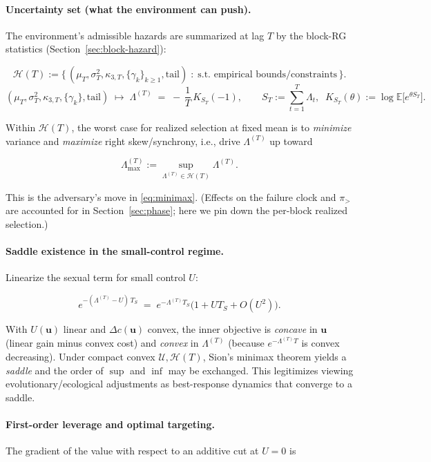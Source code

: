 \documentclass[11pt]{article}
\theoremstyle{upright}
\newcommand{\E}{\mathbb{E}}
\newcommand{\hazT}[1]{\Lambda^{(#1)}}          %
\begin{document}
\paragraph{Uncertainty set (what the environment can push).}
The environment’s admissible hazards are summarized at lag $T$ by the block-RG statistics (Section~\ref{sec:block-hazard}):

\[
\mathcal H(T)
:= \Big\{\,(\mu_T,\sigma_T^2,\kappa_{3,T},\{\gamma_k\}_{k\ge 1},\text{tail}) \;:\;
\text{s.t. empirical bounds/constraints}\,\Big\}.
\]
\[
(\mu_T,\sigma_T^2,\kappa_{3,T},\{\gamma_k\},\text{tail})
\;\longmapsto\;
\hazT{T} \;=\; -\,\frac{1}{T}\,K_{S_T}(-1),
\qquad
S_T:=\sum_{t=1}^{T}\Lambda_t,\;\; K_{S_T}(\theta):=\log \E\!\big[e^{\theta S_T}\big].
\]

Within $\mathcal H(T)$, the worst case for realized selection at fixed mean is to \emph{minimize} variance and \emph{maximize} right skew/synchrony, i.e., drive $\hazT{T}$ up toward

$$
\Lambda_{\max}^{(T)}:=\sup_{\hazT{T}\in\mathcal H(T)}\hazT{T}.
$$

This is the adversary’s move in \eqref{eq:minimax}. (Effects on the failure clock and $\pi_{>}$ are accounted for in Section~\ref{sec:phase}; here we pin down the per-block realized selection.)

\paragraph{Saddle existence in the small-control regime.}
Linearize the sexual term for small control $U$:

$$
e^{-(\hazT{T}-U)\,T_S}\;=\;e^{-\hazT{T}T_S}\big(1+U T_S + O(U^2)\big).
$$

With $U(\mathbf u)$ linear and $\Delta c(\mathbf u)$ convex, the inner objective is \emph{concave} in $\mathbf u$ (linear gain minus convex cost) and \emph{convex} in $\hazT{T}$ (because $e^{-\hazT{T} T}$ is convex decreasing). Under compact convex $\mathcal U,\mathcal H(T)$, Sion’s minimax theorem yields a \emph{saddle} and the order of $\sup$ and $\inf$ may be exchanged. This legitimizes viewing evolutionary/ecological adjustments as best-response dynamics that converge to a saddle.

\paragraph{First-order leverage and optimal targeting.}
The gradient of the value with respect to an additive cut at $U=0$ is
\end{document}
